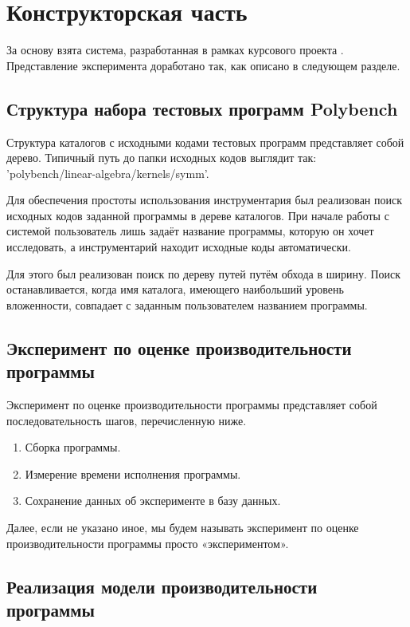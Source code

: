 \section{Конструкторская часть}

За основу взята система, разработанная в рамках курсового проекта \cite{adaptor}. Представление эксперимента доработано так, как описано в следующем разделе.

\subsection{Структура набора тестовых программ Polybench}

Структура каталогов с исходными кодами тестовых программ представляет собой дерево. Типичный путь до папки исходных кодов выглядит так: 'polybench/linear-algebra/kernels/symm'.

Для обеспечения простоты использования инструментария был реализован поиск исходных кодов заданной программы в дереве каталогов. При начале работы с системой пользователь лишь задаёт название программы, которую он хочет исследовать, а инструментарий находит исходные коды автоматически.

Для этого был реализован поиск по дереву путей путём обхода в ширину. Поиск останавливается, когда имя каталога, имеющего наибольший уровень вложенности, совпадает с заданным пользователем названием программы.

\subsection{Эксперимент по оценке производительности программы}

Эксперимент по оценке производительности программы представляет собой последовательность шагов, перечисленную ниже.

\begin{enumerate}
	\item Сборка программы.
	\item Измерение времени исполнения программы.
	\item Сохранение данных об эксперименте в базу данных.
\end{enumerate}

Далее, если не указано иное, мы будем называть эксперимент по оценке производительности программы просто «экспериментом».

\subsection{Реализация модели производительности программы}
\label{perf_mod_impl}

